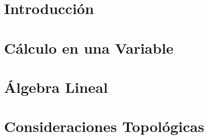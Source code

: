 \documentclass{book}
\begin{document}

\tableofcontents

\chapter{Introducción}


\chapter{Cálculo en una Variable}


\chapter{Álgebra Lineal}


\printbibliography[heading=bibintoc]

\appendix

\chapter{Consideraciones Topológicas}

\end{document}
